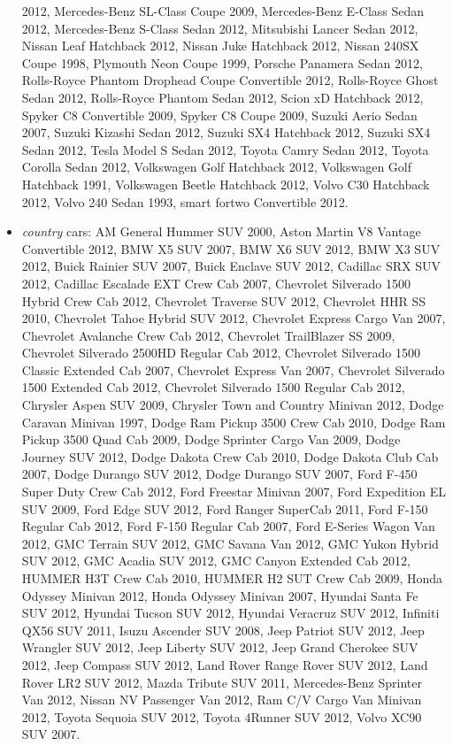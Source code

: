 \documentclass[10pt,twocolumn,letterpaper]{article}
\begin{document}
\begin{itemize}[noitemsep,topsep=0pt]
2012, Mercedes-Benz SL-Class Coupe 2009, Mercedes-Benz E-Class Sedan 2012, Mercedes-Benz S-Class Sedan 2012, Mitsubishi Lancer Sedan 2012, Nissan Leaf Hatchback 2012, Nissan Juke Hatchback 2012, Nissan 240SX Coupe 1998, Plymouth Neon Coupe 1999, Porsche Panamera Sedan 2012, Rolls-Royce Phantom Drophead Coupe Convertible 2012, Rolls-Royce Ghost Sedan 2012, Rolls-Royce Phantom Sedan 2012, Scion xD Hatchback 2012, Spyker C8 Convertible 2009, Spyker C8 Coupe 2009, Suzuki Aerio Sedan 2007, Suzuki Kizashi Sedan 2012, Suzuki SX4 Hatchback 2012, Suzuki SX4 Sedan 2012, Tesla Model S Sedan 2012, Toyota Camry Sedan 2012, Toyota Corolla Sedan 2012, Volkswagen Golf Hatchback 2012, Volkswagen Golf Hatchback 1991, Volkswagen Beetle Hatchback 2012, Volvo C30 Hatchback 2012, Volvo 240 Sedan 1993, smart fortwo Convertible 2012.
    \item \textit{country} cars: AM General Hummer SUV 2000, Aston Martin V8 Vantage Convertible 2012, BMW X5 SUV 2007, BMW X6 SUV 2012, BMW X3 SUV 2012, Buick Rainier SUV 2007, Buick Enclave SUV 2012, Cadillac SRX SUV 2012, Cadillac Escalade EXT Crew Cab 2007, Chevrolet Silverado 1500 Hybrid Crew Cab 2012, Chevrolet Traverse SUV 2012, Chevrolet HHR SS 2010, Chevrolet Tahoe Hybrid SUV 2012, Chevrolet Express Cargo Van 2007, Chevrolet Avalanche Crew Cab 2012, Chevrolet TrailBlazer SS 2009, Chevrolet Silverado 2500HD Regular Cab 2012, Chevrolet Silverado 1500 Classic Extended Cab 2007, Chevrolet Express Van 2007, Chevrolet Silverado 1500 Extended Cab 2012, Chevrolet Silverado 1500 Regular Cab 2012, Chrysler Aspen SUV 2009, Chrysler Town and Country Minivan 2012, Dodge Caravan Minivan 1997, Dodge Ram Pickup 3500 Crew Cab 2010, Dodge Ram Pickup 3500 Quad Cab 2009, Dodge Sprinter Cargo Van 2009, Dodge Journey SUV 2012, Dodge Dakota Crew Cab 2010, Dodge Dakota Club Cab 2007, Dodge Durango SUV 2012, Dodge Durango SUV 2007, Ford F-450 Super Duty Crew Cab 2012, Ford Freestar Minivan 2007, Ford Expedition EL SUV 2009, Ford Edge SUV 2012, Ford Ranger SuperCab 2011, Ford F-150 Regular Cab 2012, Ford F-150 Regular Cab 2007, Ford E-Series Wagon Van 2012, GMC Terrain SUV 2012, GMC Savana Van 2012, GMC Yukon Hybrid SUV 2012, GMC Acadia SUV 2012, GMC Canyon Extended Cab 2012, HUMMER H3T Crew Cab 2010, HUMMER H2 SUT Crew Cab 2009, Honda Odyssey Minivan 2012, Honda Odyssey Minivan 2007, Hyundai Santa Fe SUV 2012, Hyundai Tucson SUV 2012, Hyundai Veracruz SUV 2012, Infiniti QX56 SUV 2011, Isuzu Ascender SUV 2008, Jeep Patriot SUV 2012, Jeep Wrangler SUV 2012, Jeep Liberty SUV 2012, Jeep Grand Cherokee SUV 2012, Jeep Compass SUV 2012, Land Rover Range Rover SUV 2012, Land Rover LR2 SUV 2012, Mazda Tribute SUV 2011, Mercedes-Benz Sprinter Van 2012, Nissan NV Passenger Van 2012, Ram C/V Cargo Van Minivan 2012, Toyota Sequoia SUV 2012, Toyota 4Runner SUV 2012, Volvo XC90 SUV 2007.
\end{itemize}
\end{document}
